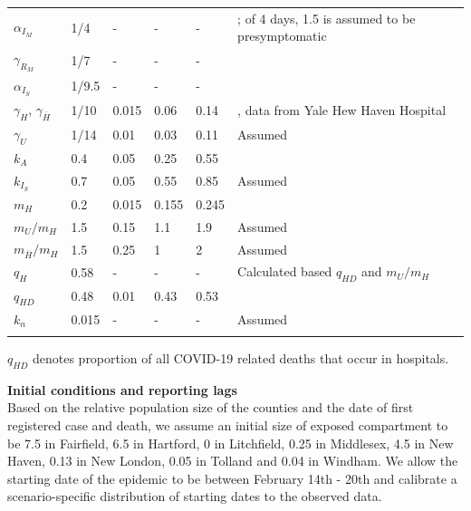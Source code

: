 \documentclass[11pt]{article}
\begin{document}
\begin{spacing}{.8}
\begin{longtable}[H] {p{} p{} p{} p{} p{} p{} }
		$\alpha_{I_M}$ & 1/4 & {-} & {-} & {-} & \citep{salje2020estimating, li2020substantial, kissler2020projecting}; of 4 days, 1.5 is assumed to be presymptomatic \citep{wei2020presymptomatic} \\[0.5em]
		$\gamma_{R_M}$ & 1/7 & {-} & {-} & {-} & \citep{wolfel2020virological, cdc2020isolation} \\[0.5em]
		$\alpha_{I_S}$ & 1/9.5 & {-} & {-} & {-} & \citep{verity2020estimates, lewnard2020incidence} \\[0.5em]
		$\gamma_H$, $\gamma_{\bar{H}}$ & 1/10 & 0.015 & 0.06 & 0.14 & \citep{lewnard2020incidence, paranjpe2020clinical}, data from Yale Hew Haven Hospital \\[0.5em]
		$\gamma_U$ & 1/14 & 0.01 & 0.03 & 0.11 & Assumed \\[0.5em]
		$k_A$ & 0.4 & 0.05 & 0.25 & 0.55 & \citep{salomon2020defining, ferguson2020impact} \\[0.5em]
		$k_{I_S}$ &  0.7 & 0.05 & 0.55 & 0.85 & Assumed \\[0.5em]
		$m_H$ & 0.2 & 0.015 & 0.155 & 0.245 & \citep{lewnard2020incidence, paranjpe2020clinical, petrilli2020factors, verity2020estimates, CHAwebsite} \\[0.5em]
		$m_U / m_H$ & 1.5 & 0.15 & 1.1 & 1.9 & Assumed \\[0.5em]
		$m_{\bar{H}} / m_H$ & 1.5 & 0.25 & 1 & 2 & Assumed \\[0.5em]
		$q_H$ & 0.58 & {-} & {-} & {-} & {Calculated based $q_{HD}$ and $m_U/m_H$} \\[0.5em]
		$q_{HD}$ & 0.48 & 0.01 & 0.43 & 0.53 & \citep{CHAwebsite, DPHwebsite} \\[0.5em]
		$k_n$ & 0.015 & {-} & {-} & {-} & Assumed \\[0.5em]
		\hline
	\label{table:priors}
	\end{longtable}
\end{spacing}

$q_{HD}$ denotes proportion of all COVID-19 related deaths that occur in hospitals.

\textbf{Initial conditions and reporting lags}\\[0.5em]
Based on the relative population size of the counties and the date of first registered case and death, we assume an initial size of exposed compartment to be 7.5 in Fairfield, 6.5 in Hartford, 0 in Litchfield, 0.25 in Middlesex, 4.5 in New Haven, 0.13 in New London, 0.05 in Tolland and 0.04 in Windham. We allow the starting date of the epidemic to be between February 14th - 20th and calibrate a scenario-specific distribution of starting dates to the observed data. 
\end{document}
